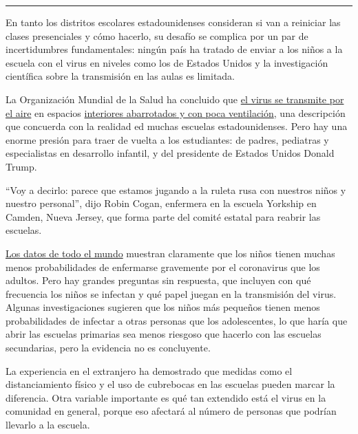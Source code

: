 \begin{center}\rule{0.5\linewidth}{\linethickness}\end{center}

En tanto los distritos escolares estadounidenses consideran si van a
reiniciar las clases presenciales y cómo hacerlo, su desafío se complica
por un par de incertidumbres fundamentales: ningún país ha tratado de
enviar a los niños a la escuela con el virus en niveles como los de
Estados Unidos y la investigación científica sobre la transmisión en las
aulas es limitada.

La Organización Mundial de la Salud ha concluido que
\href{https://slack-redir.net/link?url=https\%3A\%2F\%2Fwww.nytimes3xbfgragh.onion\%2F2020\%2F07\%2F09\%2Fhealth\%2Fvirus-aerosols-who.html}{el
virus se transmite por el aire} en espacios
\href{https://www.nytimes3xbfgragh.onion/es/2020/07/08/espanol/ciencia-y-tecnologia/coronavirus-aire-aerosoles.html}{interiores
abarrotados y con poca ventilación}, una descripción que concuerda con
la realidad ed muchas escuelas estadounidenses. Pero hay una enorme
presión para traer de vuelta a los estudiantes: de padres, pediatras y
especialistas en desarrollo infantil, y del presidente de Estados Unidos
Donald Trump.

``Voy a decirlo: parece que estamos jugando a la ruleta rusa con
nuestros niños y nuestro personal'', dijo Robin Cogan, enfermera en la
escuela Yorkship en Camden, Nueva Jersey, que forma parte del comité
estatal para reabrir las escuelas.

\href{https://www.cdc.gov/coronavirus/2019-ncov/hcp/pediatric-hcp.html\#burden-disease-risk-factors}{Los
datos de todo el mundo} muestran claramente que los niños tienen muchas
menos probabilidades de enfermarse gravemente por el coronavirus que los
adultos. Pero hay grandes preguntas sin respuesta, que incluyen con qué
frecuencia los niños se infectan y qué papel juegan en la transmisión
del virus. Algunas investigaciones sugieren que los niños más pequeños
tienen menos probabilidades de infectar a otras personas que los
adolescentes, lo que haría que abrir las escuelas primarias sea menos
riesgoso que hacerlo con las escuelas secundarias, pero la evidencia no
es concluyente.

La experiencia en el extranjero ha demostrado que medidas como el
distanciamiento físico y el uso de cubrebocas en las escuelas pueden
marcar la diferencia. Otra variable importante es qué tan extendido está
el virus en la comunidad en general, porque eso afectará al número de
personas que podrían llevarlo a la escuela.


